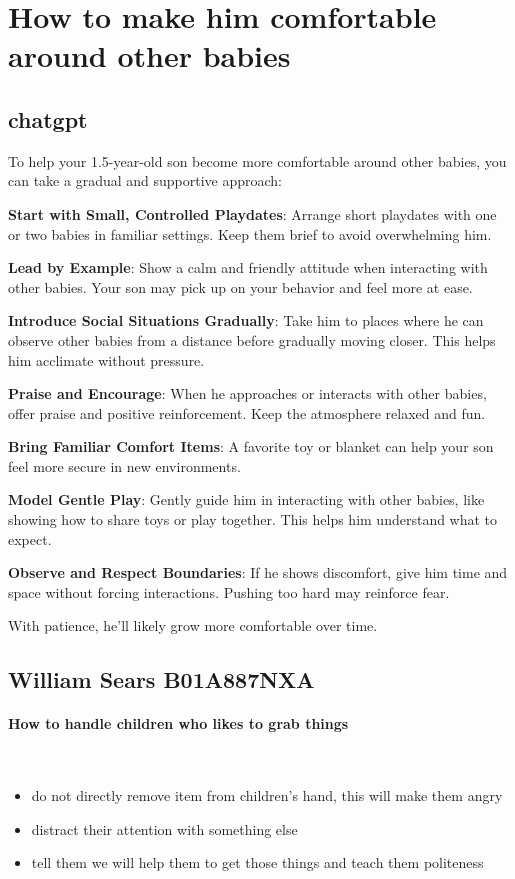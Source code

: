 \documentclass{paper}
\begin{document}
\section{How to make him comfortable around other babies}
\subsection{chatgpt}

To help your 1.5-year-old son become more comfortable around other babies, you can take a gradual and supportive approach:

\textbf{Start with Small, Controlled Playdates}: Arrange short playdates with one or two babies in familiar settings. Keep them brief to avoid overwhelming him.

\textbf{Lead by Example}: Show a calm and friendly attitude when interacting with other babies. Your son may pick up on your behavior and feel more at ease.

\textbf{Introduce Social Situations Gradually}: Take him to places where he can observe other babies from a distance before gradually moving closer. This helps him acclimate without pressure.

\textbf{Praise and Encourage}: When he approaches or interacts with other babies, offer praise and positive reinforcement. Keep the atmosphere relaxed and fun.

\textbf{Bring Familiar Comfort Items}: A favorite toy or blanket can help your son feel more secure in new environments.

\textbf{Model Gentle Play}: Gently guide him in interacting with other babies, like showing how to share toys or play together. This helps him understand what to expect.

\textbf{Observe and Respect Boundaries}: If he shows discomfort, give him time and space without forcing interactions. Pushing too hard may reinforce fear.

With patience, he’ll likely grow more comfortable over time.

\subsection{William Sears B01A887NXA}
\paragraph{How to handle children who likes to grab things}~\\
\begin{itemize}
    \item do not directly remove item from children's hand, this will make them angry
    \item distract their attention with something else
    \item tell them we will help them to get those things and teach them politeness
\end{itemize}
\end{document}
